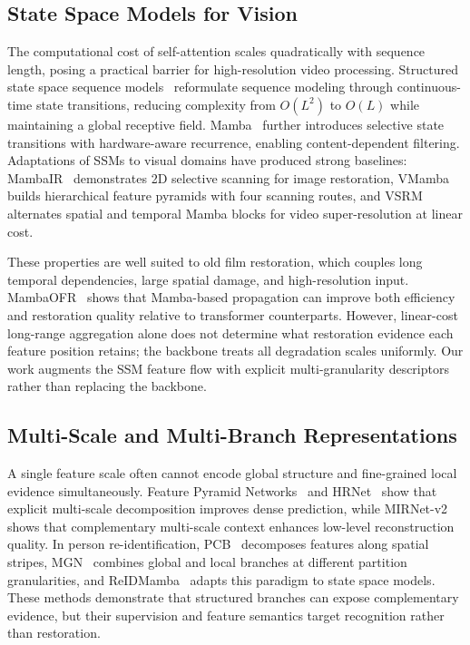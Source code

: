 \subsection{State Space Models for Vision}
\label{subsec:ssm}

The computational cost of self-attention scales quadratically with sequence length, posing a practical barrier for high-resolution video processing. Structured state space sequence models~\cite{gu2022s4} reformulate sequence modeling through continuous-time state transitions, reducing complexity from $O(L^2)$ to $O(L)$ while maintaining a global receptive field. Mamba~\cite{gu2024mamba} further introduces selective state transitions with hardware-aware recurrence, enabling content-dependent filtering. Adaptations of SSMs to visual domains have produced strong baselines: MambaIR~\cite{guo2024mambair} demonstrates 2D selective scanning for image restoration, VMamba~\cite{liu2024vmamba} builds hierarchical feature pyramids with four scanning routes, and VSRM~\cite{tran2025vsrm} alternates spatial and temporal Mamba blocks for video super-resolution at linear cost.

These properties are well suited to old film restoration, which couples long temporal dependencies, large spatial damage, and high-resolution input. MambaOFR~\cite{mao2025mambaofr} shows that Mamba-based propagation can improve both efficiency and restoration quality relative to transformer counterparts. However, linear-cost long-range aggregation alone does not determine what restoration evidence each feature position retains; the backbone treats all degradation scales uniformly. Our work augments the SSM feature flow with explicit multi-granularity descriptors rather than replacing the backbone.

\subsection{Multi-Scale and Multi-Branch Representations}
\label{subsec:multigran}

A single feature scale often cannot encode global structure and fine-grained local evidence simultaneously. Feature Pyramid Networks~\cite{lin2017fpn} and HRNet~\cite{wang2021hrnet} show that explicit multi-scale decomposition improves dense prediction, while MIRNet-v2~\cite{zamir2022mirnetv2} shows that complementary multi-scale context enhances low-level reconstruction quality. In person re-identification, PCB~\cite{sun2018pcb} decomposes features along spatial stripes, MGN~\cite{wang2018mgn} combines global and local branches at different partition granularities, and ReIDMamba~\cite{gu2025reidmamba} adapts this paradigm to state space models. These methods demonstrate that structured branches can expose complementary evidence, but their supervision and feature semantics target recognition rather than restoration.

